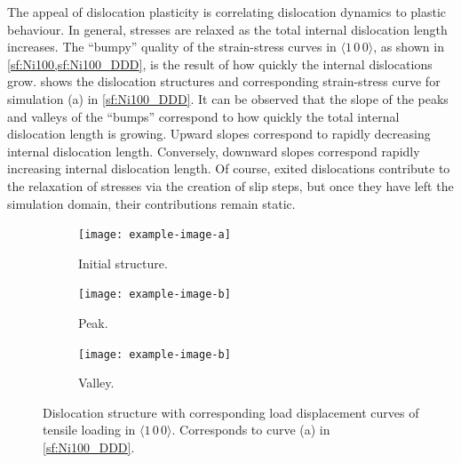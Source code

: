 The appeal of dislocation plasticity is correlating dislocation dynamics to plastic behaviour. In general, stresses are relaxed as the total internal dislocation length increases. The ``bumpy'' quality of the strain-stress curves in $\langle 1\, 0\, 0 \rangle$, as shown in \cref{sf:Ni100,sf:Ni100_DDD}, is the result of how quickly the internal dislocations grow.  shows the dislocation structures and corresponding strain-stress curve for simulation (a) in \cref{sf:Ni100_DDD}. It can be observed that the slope of the peaks and valleys of the ``bumps'' correspond to how quickly the total internal dislocation length is growing. Upward slopes correspond to rapidly decreasing internal dislocation length. Conversely, downward slopes correspond rapidly increasing internal dislocation length. Of course, exited dislocations contribute to the relaxation of stresses via the creation of slip steps, but once they have left the simulation domain, their contributions remain static.
\begin{figure}
    \centering
    \begin{subfigure}[t]{\linewidth}
        \centering
        \texttt{[image: example-image-a]}
        \caption{Initial structure.}
    \end{subfigure}

    \begin{subfigure}[t]{\linewidth}
        \centering
        \texttt{[image: example-image-b]}
        \caption{Peak.}
    \end{subfigure}

    \begin{subfigure}[t]{\linewidth}
        \centering
        \texttt{[image: example-image-b]}
        \caption{Valley.}
    \end{subfigure}
    \caption[Dislocation structure with corresponding load displacement curves of tensile loading in $\langle 1\, 0\, 0 \rangle$.]{Dislocation structure with corresponding load displacement curves of tensile loading in $\langle 1\, 0\, 0 \rangle$. Corresponds to curve (a) in \cref{sf:Ni100_DDD}.}
    \label{f:Ni100_bumps}
\end{figure}

